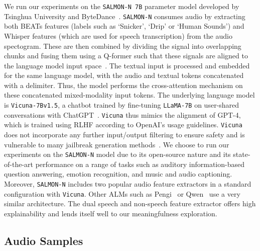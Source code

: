 We run our experiments on the \texttt{SALMON-N 7B} parameter model developed by Tsinghua University and ByteDance~\cite{tang2024salmonn}. \texttt{SALMON-N} consumes audio by extracting both BEATs features (labels such as `Snicker', `Drip' or `Human Sounds') and Whisper features (which are used for speech transcription) from the audio spectogram. These are then combined by dividing the signal into overlapping chunks and fusing them using a Q-former such that these signals are aligned to the language model input space~\cite{kim2024efficientvisuallanguagealignmentqformer}. The textual input is processed and embedded for the same language model, with the audio and textual tokens concatenated with a delimiter. Thus, the model performs the cross-attention mechanism on these concatenated mixed-modality input tokens. The underlying language model is \texttt{Vicuna-7Bv1.5}, a chatbot trained by fine-tuning \texttt{LLaMA-7B} on user-shared conversations with ChatGPT~\cite{vicuna2023}. \texttt{Vicuna} thus mimics the alignment of GPT-4, which is trained using RLHF according to OpenAI's usage guidelines. \texttt{Vicuna} does not incorporate any further input/output filtering to ensure safety and is vulnerable to many jailbreak generation methods~\cite{chao2024jailbreakbench}. We choose to run our experiments on the \texttt{SALMON-N} model due to its open-source nature and its state-of-the-art performance on a range of tasks such as auditory information-based question answering, emotion recognition, and music and audio captioning. Moreover, \texttt{SALMON-N} includes two popular audio feature extractors in a standard configuration with \texttt{Vicuna}. Other ALMs such as Pengi~\cite{deshmukh2024pengiaudiolanguagemodel} or Qwen~\cite{chu2023qwenaudioadvancinguniversalaudio} use a very similar architecture. The dual speech and non-speech feature extractor offers high explainability and lends itself well to our meaningfulness exploration.


\subsection{Audio Samples}

